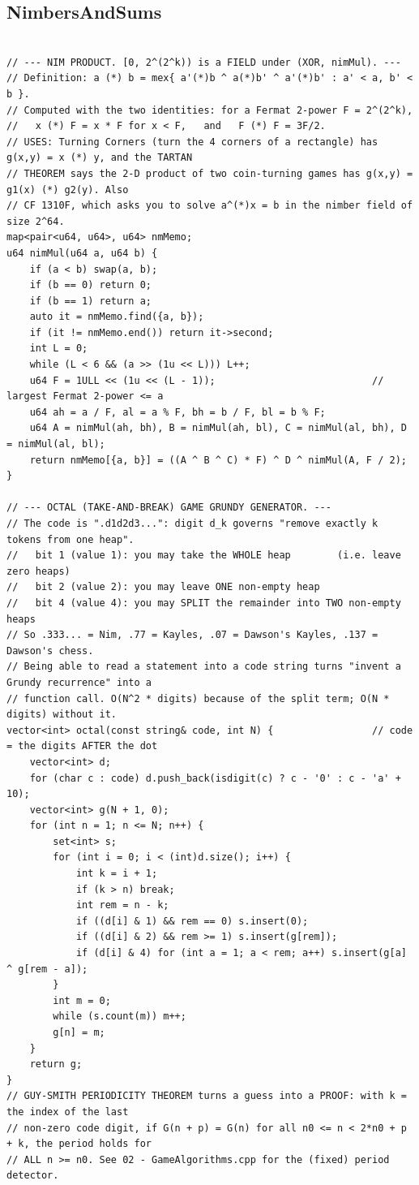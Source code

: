 \documentclass[9pt,a4paper,twocolumn]{extarticle}
\begin{document}
\subsection{NimbersAndSums}
\nopagebreak
\begin{lstlisting}

// --- NIM PRODUCT. [0, 2^(2^k)) is a FIELD under (XOR, nimMul). ---
// Definition: a (*) b = mex{ a'(*)b ^ a(*)b' ^ a'(*)b' : a' < a, b' < b }.
// Computed with the two identities: for a Fermat 2-power F = 2^(2^k),
//   x (*) F = x * F for x < F,   and   F (*) F = 3F/2.
// USES: Turning Corners (turn the 4 corners of a rectangle) has g(x,y) = x (*) y, and the TARTAN
// THEOREM says the 2-D product of two coin-turning games has g(x,y) = g1(x) (*) g2(y). Also
// CF 1310F, which asks you to solve a^(*)x = b in the nimber field of size 2^64.
map<pair<u64, u64>, u64> nmMemo;
u64 nimMul(u64 a, u64 b) {
    if (a < b) swap(a, b);
    if (b == 0) return 0;
    if (b == 1) return a;
    auto it = nmMemo.find({a, b});
    if (it != nmMemo.end()) return it->second;
    int L = 0;
    while (L < 6 && (a >> (1u << L))) L++;
    u64 F = 1ULL << (1u << (L - 1));                           // largest Fermat 2-power <= a
    u64 ah = a / F, al = a % F, bh = b / F, bl = b % F;
    u64 A = nimMul(ah, bh), B = nimMul(ah, bl), C = nimMul(al, bh), D = nimMul(al, bl);
    return nmMemo[{a, b}] = ((A ^ B ^ C) * F) ^ D ^ nimMul(A, F / 2);
}

// --- OCTAL (TAKE-AND-BREAK) GAME GRUNDY GENERATOR. ---
// The code is ".d1d2d3...": digit d_k governs "remove exactly k tokens from one heap".
//   bit 1 (value 1): you may take the WHOLE heap        (i.e. leave zero heaps)
//   bit 2 (value 2): you may leave ONE non-empty heap
//   bit 4 (value 4): you may SPLIT the remainder into TWO non-empty heaps
// So .333... = Nim, .77 = Kayles, .07 = Dawson's Kayles, .137 = Dawson's chess.
// Being able to read a statement into a code string turns "invent a Grundy recurrence" into a
// function call. O(N^2 * digits) because of the split term; O(N * digits) without it.
vector<int> octal(const string& code, int N) {                 // code = the digits AFTER the dot
    vector<int> d;
    for (char c : code) d.push_back(isdigit(c) ? c - '0' : c - 'a' + 10);
    vector<int> g(N + 1, 0);
    for (int n = 1; n <= N; n++) {
        set<int> s;
        for (int i = 0; i < (int)d.size(); i++) {
            int k = i + 1;
            if (k > n) break;
            int rem = n - k;
            if ((d[i] & 1) && rem == 0) s.insert(0);
            if ((d[i] & 2) && rem >= 1) s.insert(g[rem]);
            if (d[i] & 4) for (int a = 1; a < rem; a++) s.insert(g[a] ^ g[rem - a]);
        }
        int m = 0;
        while (s.count(m)) m++;
        g[n] = m;
    }
    return g;
}
// GUY-SMITH PERIODICITY THEOREM turns a guess into a PROOF: with k = the index of the last
// non-zero code digit, if G(n + p) = G(n) for all n0 <= n < 2*n0 + p + k, the period holds for
// ALL n >= n0. See 02 - GameAlgorithms.cpp for the (fixed) period detector.


\end{lstlisting}
\end{document}

